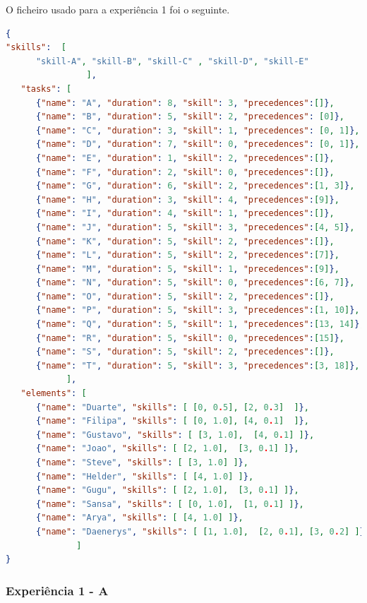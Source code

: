 \begin{titlepage}
O ficheiro usado para a experiência 1 foi o seguinte.  

\begin{lstlisting}[language=json,firstnumber=1]
{
"skills":  [ 
      "skill-A", "skill-B", "skill-C" , "skill-D", "skill-E"
                ], 
   "tasks": [
      {"name": "A", "duration": 8, "skill": 3, "precedences":[]},
      {"name": "B", "duration": 5, "skill": 2, "precedences": [0]},
      {"name": "C", "duration": 3, "skill": 1, "precedences": [0, 1]},
      {"name": "D", "duration": 7, "skill": 0, "precedences": [0, 1]},
      {"name": "E", "duration": 1, "skill": 2, "precedences":[]},
      {"name": "F", "duration": 2, "skill": 0, "precedences":[]},
      {"name": "G", "duration": 6, "skill": 2, "precedences":[1, 3]},
      {"name": "H", "duration": 3, "skill": 4, "precedences":[9]},
      {"name": "I", "duration": 4, "skill": 1, "precedences":[]},
      {"name": "J", "duration": 5, "skill": 3, "precedences":[4, 5]},
      {"name": "K", "duration": 5, "skill": 2, "precedences":[]},
      {"name": "L", "duration": 5, "skill": 2, "precedences":[7]},
      {"name": "M", "duration": 5, "skill": 1, "precedences":[9]},
      {"name": "N", "duration": 5, "skill": 0, "precedences":[6, 7]},
      {"name": "O", "duration": 5, "skill": 2, "precedences":[]},
      {"name": "P", "duration": 5, "skill": 3, "precedences":[1, 10]},
      {"name": "Q", "duration": 5, "skill": 1, "precedences":[13, 14]},
      {"name": "R", "duration": 5, "skill": 0, "precedences":[15]},
      {"name": "S", "duration": 5, "skill": 2, "precedences":[]},
      {"name": "T", "duration": 5, "skill": 3, "precedences":[3, 18]},
            ],
   "elements": [
      {"name": "Duarte", "skills": [ [0, 0.5], [2, 0.3]  ]},
      {"name": "Filipa", "skills": [ [0, 1.0], [4, 0.1]  ]},
      {"name": "Gustavo", "skills": [ [3, 1.0],  [4, 0.1] ]},
      {"name": "Joao", "skills": [ [2, 1.0],  [3, 0.1] ]},
      {"name": "Steve", "skills": [ [3, 1.0] ]},
      {"name": "Helder", "skills": [ [4, 1.0] ]},
      {"name": "Gugu", "skills": [ [2, 1.0],  [3, 0.1] ]},
      {"name": "Sansa", "skills": [ [0, 1.0],  [1, 0.1] ]}, 
      {"name": "Arya", "skills": [ [4, 1.0] ]}, 
      {"name": "Daenerys", "skills": [ [1, 1.0],  [2, 0.1], [3, 0.2] ]}
              ]
}
\end{lstlisting}

\subsubsection{Experiência 1 - A}


\end{titlepage}
